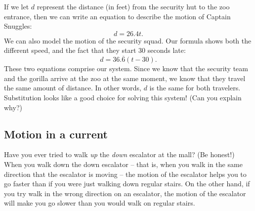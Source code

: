 If we let $d$ represent the distance (in feet) from the security hut to the zoo entrance, then we can write an equation to describe the motion of Captain Snuggles:
\[d = 26.4t.\]
We can also model the motion of the security squad. Our formula shows both the different speed, and the fact that they start 30 seconds late:
\[d=36.\overline{6}(t-30).\]
These two equations comprise our system. Since we know that the security team and the gorilla arrive at the zoo at the same moment, we know that they travel the same amount of distance. In other words, $d$ is the same for both travelers. Substitution looks like a good choice for solving this system! (Can you explain why?)

%
%
%


\subsection{Motion in a current}


Have you ever tried to walk \textit{up} the \textit{down} escalator at the mall? (Be honest!) When you walk down the down escalator -- that is, when you walk in the same direction that the escalator is moving -- the motion of the escalator helps you to go faster than if you were just walking down regular stairs. On the other hand, if you try walk in the wrong direction on an escalator, the motion of the escalator will make you go slower than you would walk on regular stairs.

